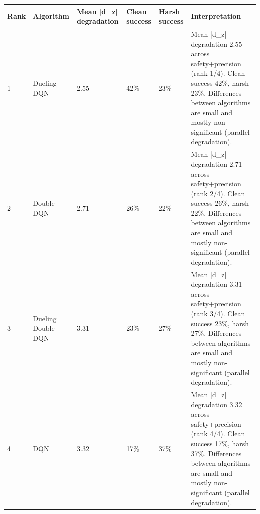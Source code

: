 \begin{tabular}{llllll}
\toprule
Rank & Algorithm & Mean |d\_z| degradation & Clean success & Harsh success & Interpretation \\
\midrule
1 & Dueling DQN & 2.55 & 42\% & 23\% & Mean |d\_z| degradation 2.55 across safety+precision (rank 1/4). Clean success 42\%, harsh 23\%. Differences between algorithms are small and mostly non-significant (parallel degradation). \\
2 & Double DQN & 2.71 & 26\% & 22\% & Mean |d\_z| degradation 2.71 across safety+precision (rank 2/4). Clean success 26\%, harsh 22\%. Differences between algorithms are small and mostly non-significant (parallel degradation). \\
3 & Dueling Double DQN & 3.31 & 23\% & 27\% & Mean |d\_z| degradation 3.31 across safety+precision (rank 3/4). Clean success 23\%, harsh 27\%. Differences between algorithms are small and mostly non-significant (parallel degradation). \\
4 & DQN & 3.32 & 17\% & 37\% & Mean |d\_z| degradation 3.32 across safety+precision (rank 4/4). Clean success 17\%, harsh 37\%. Differences between algorithms are small and mostly non-significant (parallel degradation). \\
\bottomrule
\end{tabular}
